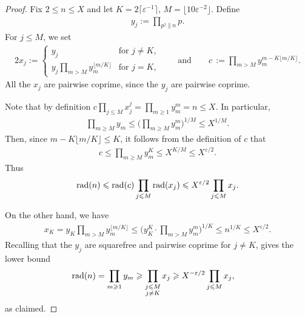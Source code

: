 \begin{proof} Fix $2\le n\le X$ and let $K=2\lceil \varepsilon^{-1}\rceil$, $M=\lfloor 10\varepsilon^{-2}\rfloor$. Define
\begin{align*}
y_j:=\prod_{p^j\|n} p.
\end{align*}
For $j\leq M$, we set
\begin{alignat*}{2}
x_j:=\begin{cases}y_j &  \text{for $j\neq K$},\\
y_j\prod_{m>M}y_m^{\lfloor m/K\rfloor} & \text{for $j=K$},
\end{cases}\qquad\text{and}\qquad
c\,:=\prod_{m>M}y_m^{m-K\lfloor m/K\rfloor}.
\end{alignat*}
All the $x_j$ are pairwise coprime, since the $y_j$ are pairwise coprime.


Note that by definition $c\prod_{j\leq M}x_j^j=\prod_{m\geq 1}y_m^m=n\leq X$. In particular,
\begin{align*}
\prod_{m\geq M}y_m\leq \Big(\prod_{m\geq M}y_m^{m}\Big)^{1/M}\leq X^{1/M}.
\end{align*}
Then, since $m-K\lfloor m/K\rfloor \le K$, it follows from the definition of $c$ that
\begin{align*}
c\leq \prod_{m\geq M}y_m^K\leq X^{K/M}\leq X^{\varepsilon/2}.
\end{align*}
Thus
$$
\operatorname{rad}(n)\leqslant \operatorname{rad}(c)\prod_{j\leqslant M}\operatorname{rad}(x_j)\leqslant X^{\varepsilon/2}  \prod_{j\leqslant M} x_j.
$$

On the other hand, we have
\begin{align*}
x_K = y_K\prod_{m> M}y_m^{\lfloor m/K\rfloor}\leq  \Big(y_K^K\cdot\prod_{m> M}y_m^m\Big)^{1/K}\leq n^{1/K}\leq X^{\varepsilon/2}.
\end{align*}
Recalling that the $y_j$ are squarefree and pairwise coprime for $j\neq K$, gives the lower bound
\begin{align*}
\operatorname{rad}(n)&=\prod_{m\geqslant 1}y_m \geqslant \prod_{\substack{j\leqslant M\\j\neq K}}x_j\geqslant X^{-\varepsilon/2}\prod_{j\leqslant M}x_j, \end{align*}
as claimed.
\end{proof}

